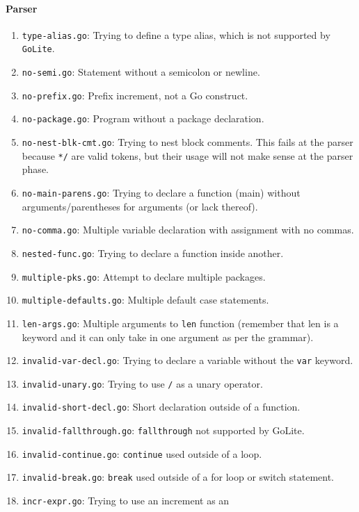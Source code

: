 \documentclass[11pt]{article}
\begin{document}
\paragraph{Parser}
\begin{enumerate}
\item \texttt{type-alias.go}: Trying to define a type alias, which is
  not supported by \texttt{GoLite}.
\item \texttt{no-semi.go}: Statement without a semicolon or newline.
\item \texttt{no-prefix.go}: Prefix increment, not a Go construct.
\item \texttt{no-package.go}: Program without a package declaration.
\item \texttt{no-nest-blk-cmt.go}: Trying to nest block comments. This
  fails at the parser because \texttt{*/} are valid tokens, but their
  usage will not make sense at the parser phase.
\item \texttt{no-main-parens.go}: Trying to declare a function (main)
  without arguments/parentheses for arguments (or lack thereof).
\item \texttt{no-comma.go}: Multiple variable declaration with
  assignment with no commas.
\item \texttt{nested-func.go}: Trying to declare a function inside
  another.
\item \texttt{multiple-pks.go}: Attempt to declare multiple packages.
\item \texttt{multiple-defaults.go}: Multiple default case statements.
\item \texttt{len-args.go}: Multiple arguments to \texttt{len}
  function (remember that len is a keyword and it can only take in one
  argument as per the grammar).
\item \texttt{invalid-var-decl.go}: Trying to declare a variable
  without the \texttt{var} keyword.
\item \texttt{invalid-unary.go}: Trying to use \texttt{/} as a unary
  operator.
\item \texttt{invalid-short-decl.go}: Short declaration outside of a
  function.
\item \texttt{invalid-fallthrough.go}: \texttt{fallthrough} not
  supported by GoLite.
\item \texttt{invalid-continue.go}: \texttt{continue} used outside of
  a loop.
\item \texttt{invalid-break.go}: \texttt{break} used outside of a for loop
  or switch statement.
\item \texttt{incr-expr.go}: Trying to use an increment as an

\end{enumerate}
\end{document}
